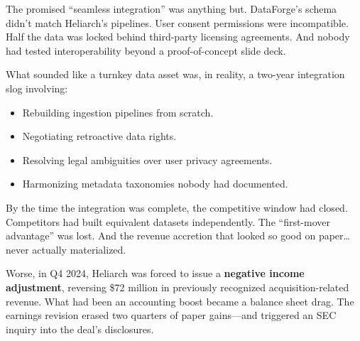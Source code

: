 The promised “seamless integration” was anything but.  
DataForge’s schema didn’t match Heliarch’s pipelines.  
User consent permissions were incompatible.  
Half the data was locked behind third-party licensing agreements.  
And nobody had tested interoperability beyond a proof-of-concept slide deck.

What sounded like a turnkey data asset was, in reality, a two-year integration slog involving:
\begin{itemize}
  \item Rebuilding ingestion pipelines from scratch.
  \item Negotiating retroactive data rights.
  \item Resolving legal ambiguities over user privacy agreements.
  \item Harmonizing metadata taxonomies nobody had documented.
\end{itemize}

By the time the integration was complete, the competitive window had closed.  
Competitors had built equivalent datasets independently.  
The “first-mover advantage” was lost.  
And the revenue accretion that looked so good on paper… never actually materialized.

Worse, in Q4 2024, Heliarch was forced to issue a \textbf{negative income adjustment}, reversing \$72 million in previously recognized acquisition-related revenue.  
What had been an accounting boost became a balance sheet drag.  The earnings revision erased two quarters of paper gains—and triggered an SEC inquiry into the deal’s disclosures.

